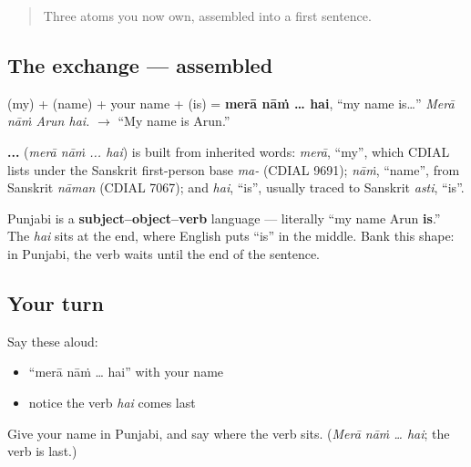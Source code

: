 \begin{quote}
Three atoms you now own, assembled into a first sentence.
\end{quote}

\subsection*{The exchange — assembled}
\textbf{} (my) + \textbf{} (name) + your name + \textbf{} (is) = \textbf{merā nāṁ … hai}, \textquotedblleft{}my name is…\textquotedblright{} \emph{Merā nāṁ Arun hai.} $\to$ \textquotedblleft{}My name is Arun.\textquotedblright{}

\begin{cousinweb}
\textbf{  ... } (\emph{merā nāṁ ... hai}) is built from inherited words: \emph{merā}, \textquotedblleft{}my\textquotedblright{}, which CDIAL lists under the Sanskrit first-person base \emph{ma-} (CDIAL 9691); \emph{nāṁ}, \textquotedblleft{}name\textquotedblright{}, from Sanskrit \emph{nāman} (CDIAL 7067); and \emph{hai}, \textquotedblleft{}is\textquotedblright{}, usually traced to Sanskrit \emph{asti}, \textquotedblleft{}is\textquotedblright{}.
\end{cousinweb}

\begin{grammarlens}[title={Grammar Lens: the verb goes last}]
Punjabi is a \textbf{subject–object–verb} language — literally \textquotedblleft{}my name Arun \textbf{is}.\textquotedblright{} The \emph{hai} sits at the end, where English puts \textquotedblleft{}is\textquotedblright{} in the middle. Bank this shape: in Punjabi, the verb waits until the end of the sentence.
\end{grammarlens}

\subsection*{Your turn}
Say these aloud:

\begin{itemize}
\raggedright
  \item \textquotedblleft{}merā nāṁ … hai\textquotedblright{} with your name
  \item notice the verb \emph{hai} comes last
\end{itemize}

\begin{tcolorbox}[breakable,colback=teal!4,colframe=teal!35!black,title={Before you move on}]
Give your name in Punjabi, and say where the verb sits. (\emph{Merā nāṁ … hai}; the verb is last.)
\end{tcolorbox}
